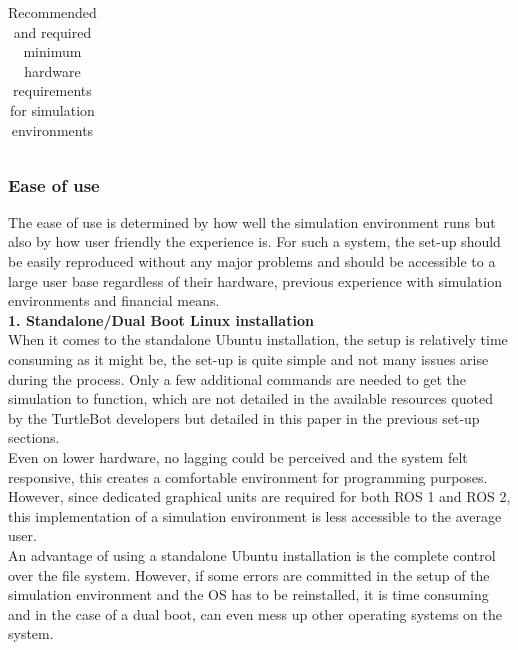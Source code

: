 \documentclass[plainarticle,zihtitle,english,final,hyperref,utf8]{zihpub}
\begin{document}
\begin{table}[h!]
{\begin{tabular}{c|l|ll|ll|c|c}
\end{tabular}}
\caption{Recommended and required minimum hardware requirements for simulation environments}
\label{tab:simulation_requirements}
\end{table}


\subsubsection{Ease of use}
The ease of use is determined by how well the simulation environment runs but also by how user friendly the experience is. For such a system, the set-up should be easily reproduced without any major problems and should be accessible to a large user base regardless of their hardware, previous experience with simulation environments and financial means.\\

\textbf{1. Standalone/Dual Boot Linux installation}\\
When it comes to the standalone Ubuntu installation, the setup is relatively time consuming as it might be, the set-up is quite simple and not many issues arise during the process. Only a few additional commands are needed to get the simulation to function, which are not detailed in the available resources quoted by the TurtleBot developers but detailed in this paper in the previous set-up sections. \\
\newline
Even on lower hardware, no lagging could be perceived and the system felt responsive, this creates a comfortable environment for programming purposes. However, since dedicated graphical units are required for both ROS 1 and ROS 2, this implementation of a simulation environment is less accessible to the average user.\\
\newline
An advantage of using a standalone Ubuntu installation is the complete control over the file system. However, if some errors are committed in the setup of the simulation environment and the OS has to be reinstalled, it is time consuming and in the case of a dual boot, can even mess up other operating systems on the system.\\
\end{document}
